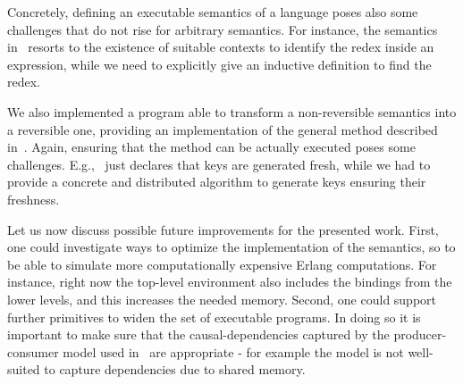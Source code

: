 \documentclass{article}[12pt,a4paper]
\theoremstyle{definition}
\begin{document}
Concretely, defining an executable semantics of a language poses also
some challenges that do not rise for arbitrary semantics. For
instance, the semantics in~\cite{Gonzalez-AbrilV21} resorts to the
existence of suitable contexts to identify the redex inside an
expression, while we need to explicitly give an inductive definition
to find the redex.

We also implemented a program able to transform a non-reversible
semantics into a reversible one, providing an implementation of the
general method described in~\cite{LaneseM20}. Again, ensuring that the
method can be actually executed poses some challenges.
E.g.,~\cite{LaneseM20} just declares that
keys are generated fresh, while we had to provide a concrete and
distributed algorithm to generate keys ensuring their freshness.

Let us now discuss possible future improvements for the presented
work. First, one could investigate ways to optimize the implementation
of the semantics, so to be able to simulate more computationally
expensive Erlang computations. For instance, right now the top-level
environment also includes the bindings from the lower levels, and this
increases the needed memory.  Second, one could support further
primitives to widen the set of executable programs. In doing so it is
important to make sure that the causal-dependencies captured by the
producer-consumer model used in~\cite{LaneseM20} are appropriate - for
example the model is not well-suited to capture dependencies due to
shared memory.



\end{document}
